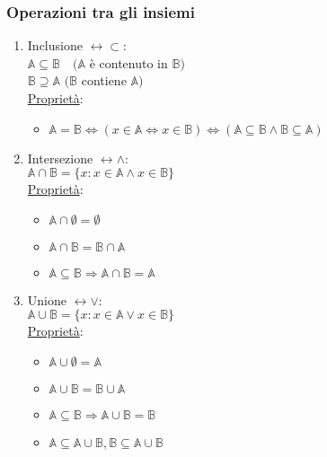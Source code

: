\documentclass{article}
\begin{document}
\subsubsection*{Operazioni tra gli insiemi}
\begin{enumerate}
	\item Inclusione $\leftrightarrow\subset$:\\
	      $\mathbb{A}\subseteq\mathbb{B}\quad(\mathbb{A}$ è contenuto in $\mathbb{B})$\\
	      $\mathbb{B}\supseteq\mathbb{A}$ $(\mathbb{B}$ contiene $\mathbb{A})$
	      \\
	      \ul{Proprietà}:
	      \begin{itemize}
		      \item $\mathbb{A}=\mathbb{B}\Leftrightarrow(x\in\mathbb{A}\Leftrightarrow x\in\mathbb{B})\Leftrightarrow(\mathbb{A}\subseteq\mathbb{B}\wedge\mathbb{B}\subseteq\mathbb{A})$
	      \end{itemize}
	\item Intersezione $\leftrightarrow\wedge$:\\
	      $\mathbb{A}\cap\mathbb{B}=\{x:x\in\mathbb{A}\wedge x\in\mathbb{B}\}$\\
	      \ul{Proprietà}:
	      \begin{itemize}
		      \item $\mathbb{A}\cap\emptyset=\emptyset$
		      \item $\mathbb{A}\cap\mathbb{B}=\mathbb{B}\cap\mathbb{A}$
		      \item $\mathbb{A}\subseteq\mathbb{B}\Rightarrow\mathbb{A}\cap\mathbb{B}=\mathbb{A}$
	      \end{itemize}
	\item Unione $\leftrightarrow\vee$:\\
	      $\mathbb{A}\cup\mathbb{B}=\{x:x\in\mathbb{A}\vee x\in\mathbb{B}\}$\\
	      \ul{Proprietà}:
	      \begin{itemize}
		      \item $\mathbb{A}\cup\emptyset=\mathbb{A}$
		      \item $\mathbb{A}\cup\mathbb{B}=\mathbb{B}\cup\mathbb{A}$
		      \item $\mathbb{A}\subseteq\mathbb{B}\Rightarrow\mathbb{A}\cup\mathbb{B}=\mathbb{B}$
		      \item $\mathbb{A}\subseteq\mathbb{A}\cup\mathbb{B},\mathbb{B}\subseteq\mathbb{A}\cup\mathbb{B}$

\end{itemize}
\end{enumerate}
\end{document}
